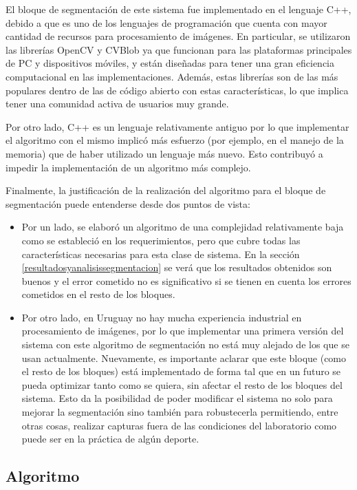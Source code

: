 El bloque de segmentación de este sistema fue implementado en el lenguaje C++, debido a que es uno de los lenguajes de programación que cuenta con mayor cantidad de recursos para procesamiento de imágenes. En particular, se utilizaron las librerías OpenCV\cite{opencv} y CVBlob\cite{cvblob} ya que funcionan para las plataformas principales de PC y dispositivos móviles, y están diseñadas para tener una gran eficiencia computacional en las implementaciones. Además, estas librerías son de las más populares dentro de las de código abierto con estas características, lo que implica tener una comunidad activa de usuarios muy grande.

Por otro lado, C++ es un lenguaje relativamente antiguo por lo que implementar el algoritmo con el mismo implicó más esfuerzo (por ejemplo, en el manejo de la memoria) que de haber utilizado un lenguaje más nuevo. Esto contribuyó a impedir la implementación de un algoritmo más complejo.

Finalmente, la justificación de la realización del algoritmo para el bloque de segmentación puede entenderse desde dos puntos de vista: 
\begin{itemize}
 \item Por un lado, se elaboró un algoritmo de una complejidad relativamente baja como se estableció en los requerimientos, pero que cubre todas las características necesarias para esta clase de sistema. En la sección \ref{resultadosyanalisissegmentacion} se verá que los resultados obtenidos son buenos y el error cometido no es significativo si se tienen en cuenta los errores cometidos en el resto de los bloques.
 \item Por otro lado, en Uruguay no hay mucha experiencia industrial en procesamiento de imágenes, por lo que implementar una primera versión del sistema con este algoritmo de segmentación no está muy alejado de los que se usan actualmente. Nuevamente, es importante aclarar que este bloque (como el resto de los bloques) está implementado de forma tal que en un futuro se pueda optimizar tanto como se quiera, sin afectar el resto de los bloques del sistema. Esto da la posibilidad de poder modificar el sistema no solo para mejorar la segmentación sino también para robustecerla permitiendo, entre otras cosas, realizar capturas fuera de las condiciones del laboratorio como puede ser en la práctica de algún deporte.
\end{itemize}


\subsection{Algoritmo}

